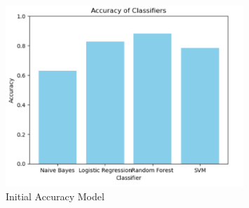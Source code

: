 \begin{figure}[h!]
	\centering
	\includegraphics[width=0.8\textwidth]{images/accuracy_model_init_result.png}
	\caption{Initial Accuracy Model}
	\label{fig:initial_accuracy_model}
\end{figure}

